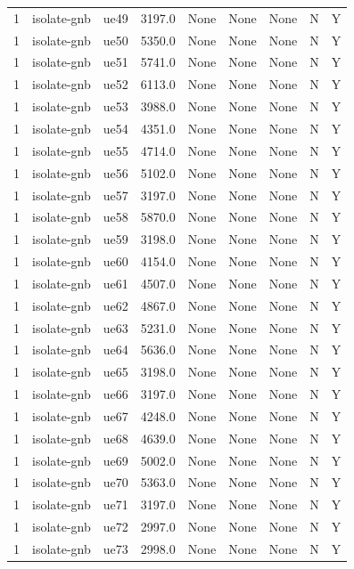 \begin{table}[ht]
\begin{tabular}{|c|c|c|c|c|c|c|c|c|}
1 & isolate-gnb & ue49 & 3197.0 & None & None & None & N & Y \\
1 & isolate-gnb & ue50 & 5350.0 & None & None & None & N & Y \\
1 & isolate-gnb & ue51 & 5741.0 & None & None & None & N & Y \\
1 & isolate-gnb & ue52 & 6113.0 & None & None & None & N & Y \\
1 & isolate-gnb & ue53 & 3988.0 & None & None & None & N & Y \\
1 & isolate-gnb & ue54 & 4351.0 & None & None & None & N & Y \\
1 & isolate-gnb & ue55 & 4714.0 & None & None & None & N & Y \\
1 & isolate-gnb & ue56 & 5102.0 & None & None & None & N & Y \\
1 & isolate-gnb & ue57 & 3197.0 & None & None & None & N & Y \\
1 & isolate-gnb & ue58 & 5870.0 & None & None & None & N & Y \\
1 & isolate-gnb & ue59 & 3198.0 & None & None & None & N & Y \\
1 & isolate-gnb & ue60 & 4154.0 & None & None & None & N & Y \\
1 & isolate-gnb & ue61 & 4507.0 & None & None & None & N & Y \\
1 & isolate-gnb & ue62 & 4867.0 & None & None & None & N & Y \\
1 & isolate-gnb & ue63 & 5231.0 & None & None & None & N & Y \\
1 & isolate-gnb & ue64 & 5636.0 & None & None & None & N & Y \\
1 & isolate-gnb & ue65 & 3198.0 & None & None & None & N & Y \\
1 & isolate-gnb & ue66 & 3197.0 & None & None & None & N & Y \\
1 & isolate-gnb & ue67 & 4248.0 & None & None & None & N & Y \\
1 & isolate-gnb & ue68 & 4639.0 & None & None & None & N & Y \\
1 & isolate-gnb & ue69 & 5002.0 & None & None & None & N & Y \\
1 & isolate-gnb & ue70 & 5363.0 & None & None & None & N & Y \\
1 & isolate-gnb & ue71 & 3197.0 & None & None & None & N & Y \\
1 & isolate-gnb & ue72 & 2997.0 & None & None & None & N & Y \\
1 & isolate-gnb & ue73 & 2998.0 & None & None & None & N & Y \\

\end{tabular}
\end{table}
